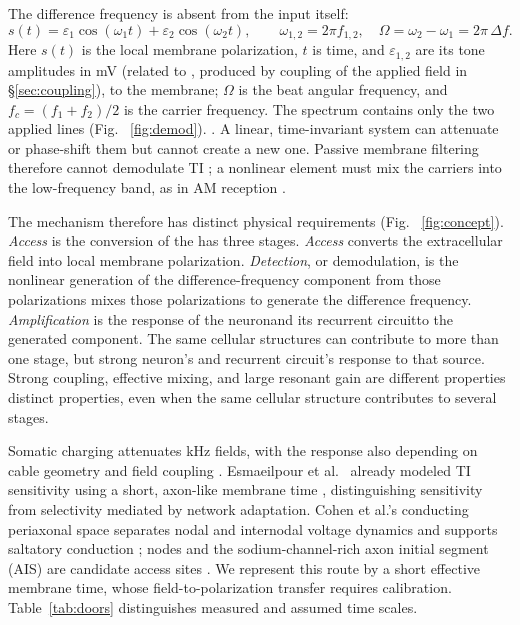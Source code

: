 \documentclass[11pt,a4paper]{article}
\providecommand{\DIFaddtex}[1]{{\protect\color{blue} \sf #1}} %
\providecommand{\DIFdeltex}[1]{{\protect\color{red} \scriptsize #1}} %
\providecommand{\DIFaddbegin}{} %
\providecommand{\DIFaddend}{} %
\providecommand{\DIFdelbegin}{} %
\providecommand{\DIFdelend}{} %
\providecommand{\DIFadd}[1]{\texorpdfstring{\DIFaddtex{#1}}{#1}} %
\providecommand{\DIFdel}[1]{\texorpdfstring{\DIFdeltex{#1}}{}} %
\begin{document}
The difference frequency is absent from the input itself:
\begin{equation}
s(t)=\varepsilon_1\cos(\omega_1 t)+\varepsilon_2\cos(\omega_2 t),\qquad
\omega_{1,2}=2\pi f_{1,2},\quad \Omega=\omega_2-\omega_1=2\pi\,\Delta f .
\label{eq:am}
\end{equation}
Here $s(t)$ is the local membrane polarization, $t$ is time, and
$\varepsilon_{1,2}$ are its tone amplitudes in mV\DIFdelbegin \DIFdel{(related to }\DIFdelend \DIFaddbegin \DIFadd{, produced by coupling of }\DIFaddend the applied field \DIFdelbegin \DIFdel{in \S\ref{sec:coupling}), }\DIFdelend \DIFaddbegin \DIFadd{to the membrane; }\DIFaddend $\Omega$ is the beat angular frequency, and
$f_c=(f_1+f_2)/2$ is the carrier frequency. The spectrum contains only the two applied lines\DIFdelbegin \DIFdel{(Fig. ~\ref{fig:demod}). }\DIFdelend \DIFaddbegin \DIFadd{. }\DIFaddend A linear, time-invariant system can attenuate or phase-shift
them but cannot create a new one. Passive membrane filtering therefore cannot
demodulate TI \cite{mirzakhalili2020}; a nonlinear element must mix the carriers into
the low-frequency band, as in AM reception \cite{nahin2001}.

The mechanism \DIFdelbegin \DIFdel{therefore has distinct physical requirements (Fig. ~\ref{fig:concept}).
\emph{Access} is the conversion of the }\DIFdelend \DIFaddbegin \DIFadd{has three stages. \emph{Access} converts the }\DIFaddend extracellular field
into local membrane polarization. \emph{Detection}, or demodulation, \DIFdelbegin \DIFdel{is the nonlinear generation of the
difference-frequency component from those
polarizations }\DIFdelend \DIFaddbegin \DIFadd{mixes those
polarizations to generate the difference frequency}\DIFaddend . \emph{Amplification} is the
\DIFdelbegin \DIFdel{response of the neuronand its recurrent circuitto the generated component. The same cellular structures can contribute to more than one stage, but strong
}\DIFdelend \DIFaddbegin \DIFadd{neuron's and recurrent circuit's response to that source. Strong }\DIFaddend coupling,
effective mixing, and \DIFdelbegin \DIFdel{large }\DIFdelend resonant gain are \DIFdelbegin \DIFdel{different properties}\DIFdelend \DIFaddbegin \DIFadd{distinct properties, even when the
same cellular structure contributes to several stages}\DIFaddend .

Somatic charging attenuates kHz fields, with the response also depending on cable
geometry and field coupling \cite{deitcher2017,eyal2016}. Esmaeilpour et al.\
\cite{esmaeilpour2021} already modeled TI sensitivity using a short, axon-like
membrane time\DIFaddbegin \DIFadd{, distinguishing sensitivity from selectivity mediated by
network adaptation}\DIFaddend . Cohen et al.'s conducting periaxonal space separates nodal and
internodal voltage dynamics and supports saltatory conduction
\cite{cohen2020periaxonal}; nodes and the sodium-channel-rich axon initial segment
(AIS) are candidate access sites \cite{kole2008ais}. We represent this route by a
short effective membrane time, whose field-to-polarization transfer requires
calibration.
\DIFdelbegin \DIFdel{Table~\ref{tab:doors} distinguishes measured and assumed time scales.
}\DIFdelend
\end{document}
